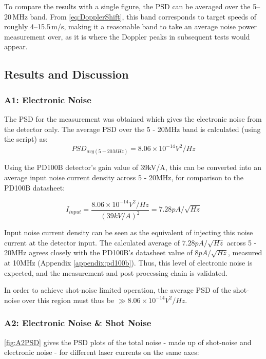  To compare the results with a single figure, the PSD can be averaged over the 5--20\,MHz band.
 From \autoref{eq:DopplerShift}, this band corresponds to target speeds of roughly
 4--15.5\,m/s, making it a reasonable band to take an average noise power measurement over, as it is where the Doppler peaks in subsequent tests would appear.

\subsection{Results and Discussion}
\subsubsection{A1: Electronic Noise}
The PSD for the measurement was obtained which gives the electronic noise from the detector only. The average PSD over the 5 - 20MHz band is calculated (using the script) as:
\begin{equation}
	PSD_{avg (5 - 20MHz)} = 8.06\times 10^{-14}V^2/Hz
\end{equation}

Using the PD100B detector's gain value of 39kV/A, this can be converted into an average input noise current density across 5 - 20MHz, for comparison to the PD100B datasheet:

\begin{equation}
    I_{input} = \frac{8.06\times 10^{-14}V^2/Hz}{(39kV/A)^2}=7.28pA/\sqrt{Hz}
\end{equation}

Input noise current density can be seen as the equivalent of injecting this noise current at the detector input. The calculated average of $7.28pA/\sqrt{Hz}$ across 5 - 20MHz agrees closely with the PD100B's datasheet value of $8pA/\sqrt{Hz}$, measured at 10MHz (Appendix \ref{appendix:pd100b}). Thus, this level of electronic noise is expected, and the measurement and post processing chain is validated. 

In order to achieve shot-noise limited operation, the average PSD of the shot-noise over this region must thus be $\gg8.06\times 10^{-14}V^2/Hz$.

\subsubsection{A2: Electronic Noise \& Shot Noise}
\autoref{fig:A2PSD} gives the PSD plots of the total noise - made up of shot-noise and electronic noise - for different laser currents on the same axes:

